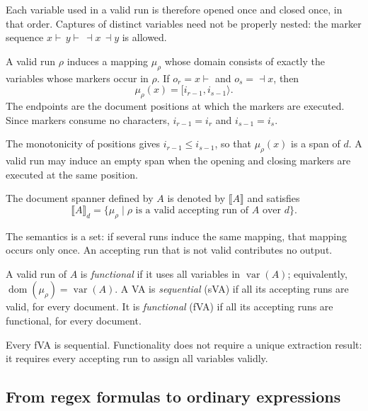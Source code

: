 Each variable used in a valid run is therefore opened once and closed once,
in that order. Captures of distinct variables need not be properly nested:
the marker sequence $x\vdash\,y\vdash\,\dashv x\,\dashv y$ is allowed.

\begin{definition}\label{def:run-mapping}
A valid run $\rho$ induces a mapping $\mu_\rho$ whose domain consists
of exactly the variables whose markers occur in $\rho$.
If $o_r=x\vdash$ and $o_s=\dashv x$, then
\[
  \mu_\rho(x)=[i_{r-1},i_{s-1}\rangle.
\]
The endpoints are the document positions at which the markers are executed.
Since markers consume no characters, $i_{r-1}=i_r$ and $i_{s-1}=i_s$.
\end{definition}

The monotonicity of positions gives $i_{r-1}\leq i_{s-1}$, so that
$\mu_\rho(x)$ is a span of $d$. A valid run may induce an empty span
when the opening and closing markers are executed at the same position.

\begin{definition}[Semantics of a VA]\label{def:va-semantics}
The document spanner defined by $A$ is denoted by $\llbracket A\rrbracket$
and satisfies
\[
  \llbracket A\rrbracket_d
  =\{\mu_\rho\mid\rho\text{ is a valid accepting run of }A\text{ over }d\}.
\]
\end{definition}

The semantics is a set: if several runs induce the same mapping,
that mapping occurs only once. An accepting run that is not valid
contributes no output.

\begin{definition}\label{def:sequential-functional}
A valid run of $A$ is \emph{functional} if it uses all variables in
$\operatorname{var}(A)$; equivalently,
$\operatorname{dom}(\mu_\rho)=\operatorname{var}(A)$.
A VA is \emph{sequential} (sVA) if all its accepting runs are valid,
for every document. It is \emph{functional} (fVA) if all its accepting
runs are functional, for every document.
\end{definition}

Every fVA is sequential. Functionality does not require a unique extraction
result: it requires every accepting run to assign all variables validly.


\subsection{From regex formulas to ordinary expressions}
\label{subsec:tau}

